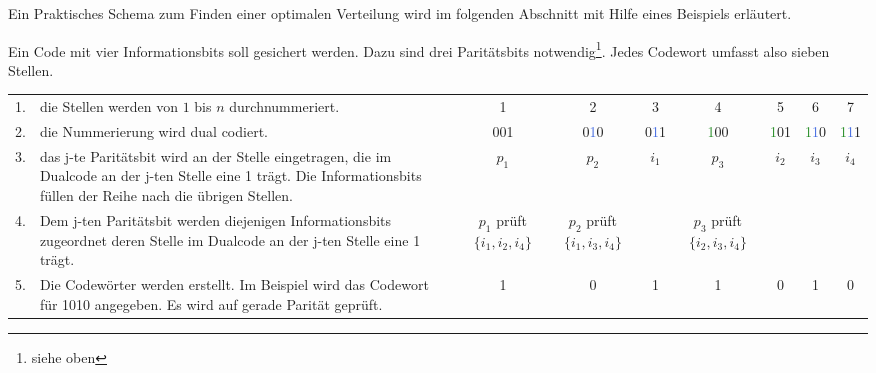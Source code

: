 Ein Praktisches Schema zum Finden einer optimalen Verteilung wird im folgenden Abschnitt mit Hilfe eines Beispiels erläutert.

Ein Code mit vier Informationsbits soll gesichert werden. Dazu sind drei
Paritätsbits notwendig\footnote{siehe oben}. Jedes Codewort umfasst also sieben
Stellen.
\begin{center}
\begin{tabular}{rp{3.6cm}ccccccc}
1. & die Stellen werden von $1$ 
     bis $n$ durchnummeriert.   &  1  &  2  &  3  &  4  &  5  &  6  &  7  \\
2. & die Nummerierung wird
     dual codiert.       & 00\textcolor{BrickRed}{1}
                          & 0\textcolor{RoyalBlue}{1}0 
     					   & 0\textcolor{RoyalBlue}{1}\textcolor{BrickRed}{1} 
						    & \textcolor{ForestGreen}{1}00 
						     & \textcolor{ForestGreen}{1}0\textcolor{BrickRed}{1}
						      & \textcolor{ForestGreen}{1}\textcolor{RoyalBlue}{1}0 
						       & \textcolor{ForestGreen}{1}\textcolor{RoyalBlue}{1}\textcolor{BrickRed}{1} \\
3. & das j-te Paritätsbit wird
     an der Stelle  eingetragen, 
     die im Dualcode an der j-ten Stelle eine 1 trägt. Die
     Informationsbits füllen
     der Reihe nach die 
     übrigen Stellen.           &$p_1$&$p_2$&$i_1$&$p_3$&$i_2$&$i_3$&$i_4$ \\
4. & Dem j-ten Paritätsbit
     werden diejenigen Informationsbits zugeordnet
     deren Stelle  im Dualcode an der j-ten Stelle
     eine 1 trägt. & \parbox[t]{1.5cm}{\centering $p_1$ \\ prüft \\$\{i_1,i_2,i_4\}$}
     & \parbox[t]{1.5cm}{\centering $p_2$ \\ prüft \\ $\{i_1,i_3,i_4\}$}
     & & \parbox[t]{1.5cm}{\centering $p_3$ \\ prüft \\ $\{i_2,i_3,i_4\}$} \\
5. & Die Codewörter werden erstellt.
     Im Beispiel wird das Codewort für 1010 angegeben. 
     Es wird auf gerade Parität geprüft. & 1 & 0 & 1 & 1 & 0 & 1 & 0 \\ 
     
\end{tabular}
\end{center}

